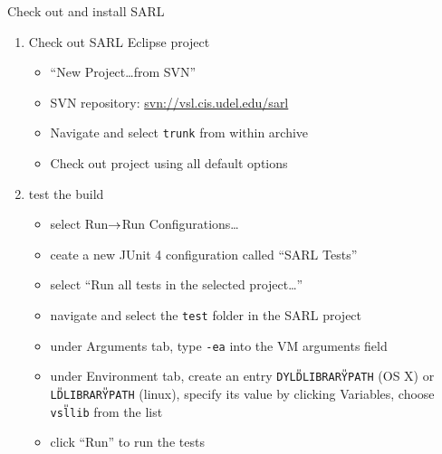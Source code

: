 \documentclass[t]{beamer}
\begin{document}
\begin{frame}{Check out and install SARL}
  \begin{enumerate}
  \item Check out SARL Eclipse project 
    \begin{itemize}
    \item ``New Project\ldots from SVN''
    \item SVN repository: \url{svn://vsl.cis.udel.edu/sarl}
    \item Navigate and select \texttt{trunk} from within archive
    \item Check out project using all default options
    \end{itemize}
  \item test the build
    \begin{itemize}
    \item select Run$\rightarrow$Run Configurations\ldots
    \item ceate a new JUnit 4 configuration called ``SARL Tests''
    \item select ``Run all tests in the selected project\ldots''
    \item navigate and select the \texttt{test} folder in the SARL project
    \item under Arguments tab, type \texttt{-ea} into the VM arguments field
    \item under Environment tab, create an entry
      \texttt{DYLD{\U}LIBRARY{\U}PATH} (OS X) or
      \texttt{LD{\U}LIBRARY{\U}PATH} (linux), specify its value by
      clicking Variables, choose \texttt{vsl{\U}lib} from the list
    \item click ``Run'' to run the tests
    \end{itemize}
  \end{enumerate}
\end{frame}
\end{document}
